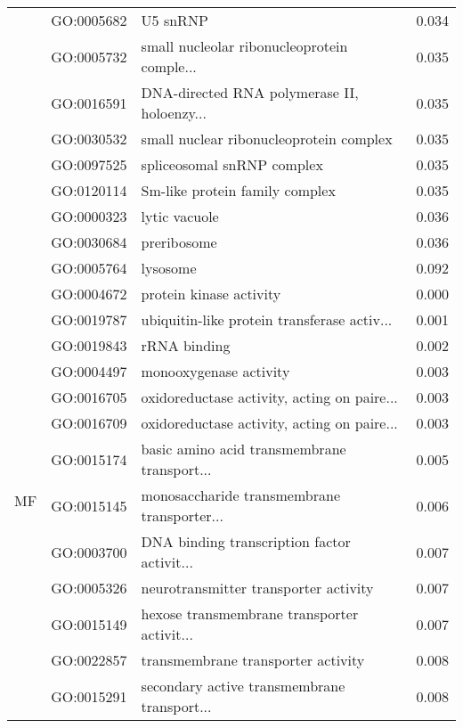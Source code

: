 \begin{longtable}{lllr}
   & GO:0005682 &                                     U5 snRNP &         0.034 \\
   & GO:0005732 &  small nucleolar ribonucleoprotein comple... &         0.035 \\
   & GO:0016591 &  DNA-directed RNA polymerase II, holoenzy... &         0.035 \\
   & GO:0030532 &      small nuclear ribonucleoprotein complex &         0.035 \\
   & GO:0097525 &                   spliceosomal snRNP complex &         0.035 \\
   & GO:0120114 &               Sm-like protein family complex &         0.035 \\
   & GO:0000323 &                                lytic vacuole &         0.036 \\
   & GO:0030684 &                                  preribosome &         0.036 \\
   & GO:0005764 &                                     lysosome &         0.092 \\
\cline{1-4}
\multirow{61}{*}{MF} & GO:0004672 &                      protein kinase activity &         0.000 \\
   & GO:0019787 &  ubiquitin-like protein transferase activ... &         0.001 \\
   & GO:0019843 &                                 rRNA binding &         0.002 \\
   & GO:0004497 &                       monooxygenase activity &         0.003 \\
   & GO:0016705 &  oxidoreductase activity, acting on paire... &         0.003 \\
   & GO:0016709 &  oxidoreductase activity, acting on paire... &         0.003 \\
   & GO:0015174 &  basic amino acid transmembrane transport... &         0.005 \\
   & GO:0015145 &  monosaccharide transmembrane transporter... &         0.006 \\
   & GO:0003700 &  DNA binding transcription factor activit... &         0.007 \\
   & GO:0005326 &        neurotransmitter transporter activity &         0.007 \\
   & GO:0015149 &  hexose transmembrane transporter activit... &         0.007 \\
   & GO:0022857 &           transmembrane transporter activity &         0.008 \\
   & GO:0015291 &  secondary active transmembrane transport... &         0.008 \\

\end{longtable}
